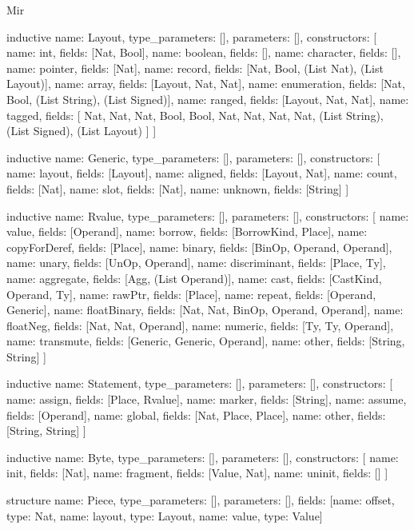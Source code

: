 \begin{lexlean}{Mir}
\begin{semanticmodule}
inductive{
  name: Layout,
  type_parameters: [],
  parameters: [],
  constructors: [
    {name: int, fields: [Nat, Bool]},
    {name: boolean, fields: []},
    {name: character, fields: []},
    {name: pointer, fields: [Nat]},
    {name: record, fields: [Nat, Bool, (List Nat), (List Layout)]},
    {name: array, fields: [Layout, Nat, Nat]},
    {name: enumeration, fields: [Nat, Bool, (List String), (List Signed)]},
    {name: ranged, fields: [Layout, Nat, Nat]},
    {
      name: tagged,
      fields: [
        Nat,
        Nat,
        Nat,
        Bool,
        Bool,
        Nat,
        Nat,
        Nat,
        Nat,
        (List String),
        (List Signed),
        (List Layout)
      ]
    }
  ]
}

inductive{
  name: Generic,
  type_parameters: [],
  parameters: [],
  constructors: [
    {name: layout, fields: [Layout]},
    {name: aligned, fields: [Layout, Nat]},
    {name: count, fields: [Nat]},
    {name: slot, fields: [Nat]},
    {name: unknown, fields: [String]}
  ]
}

inductive{
  name: Rvalue,
  type_parameters: [],
  parameters: [],
  constructors: [
    {name: value, fields: [Operand]},
    {name: borrow, fields: [BorrowKind, Place]},
    {name: copyForDeref, fields: [Place]},
    {name: binary, fields: [BinOp, Operand, Operand]},
    {name: unary, fields: [UnOp, Operand]},
    {name: discriminant, fields: [Place, Ty]},
    {name: aggregate, fields: [Agg, (List Operand)]},
    {name: cast, fields: [CastKind, Operand, Ty]},
    {name: rawPtr, fields: [Place]},
    {name: repeat, fields: [Operand, Generic]},
    {name: floatBinary, fields: [Nat, Nat, BinOp, Operand, Operand]},
    {name: floatNeg, fields: [Nat, Nat, Operand]},
    {name: numeric, fields: [Ty, Ty, Operand]},
    {name: transmute, fields: [Generic, Generic, Operand]},
    {name: other, fields: [String, String]}
  ]
}

inductive{
  name: Statement,
  type_parameters: [],
  parameters: [],
  constructors: [
    {name: assign, fields: [Place, Rvalue]},
    {name: marker, fields: [String]},
    {name: assume, fields: [Operand]},
    {name: global, fields: [Nat, Place, Place]},
    {name: other, fields: [String, String]}
  ]
}

inductive{
  name: Byte,
  type_parameters: [],
  parameters: [],
  constructors: [
    {name: init, fields: [Nat]},
    {name: fragment, fields: [Value, Nat]},
    {name: uninit, fields: []}
  ]
}

structure{
  name: Piece,
  type_parameters: [],
  parameters: [],
  fields: [{name: offset, type: Nat}, {name: layout, type: Layout}, {name: value, type: Value}]
}


\end{semanticmodule}
\end{lexlean}
